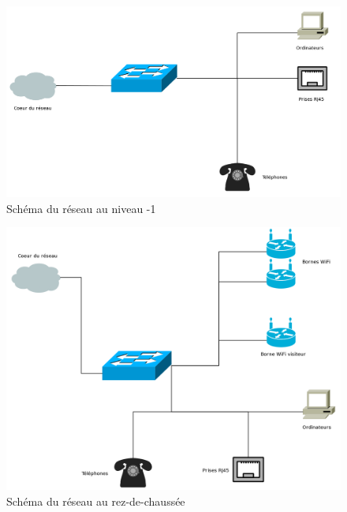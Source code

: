 \begin{figure}[!ht]
    \center
    \includegraphics[width=1\textwidth]{./images/etage_n-1.png}
    \caption{Schéma du réseau au niveau -1}
\end{figure}

\begin{figure}[!ht]
    \center
    \includegraphics[width=1\textwidth]{./images/rez-de-chaussee.png}
    \caption{Schéma du réseau au rez-de-chaussée }
\end{figure}

